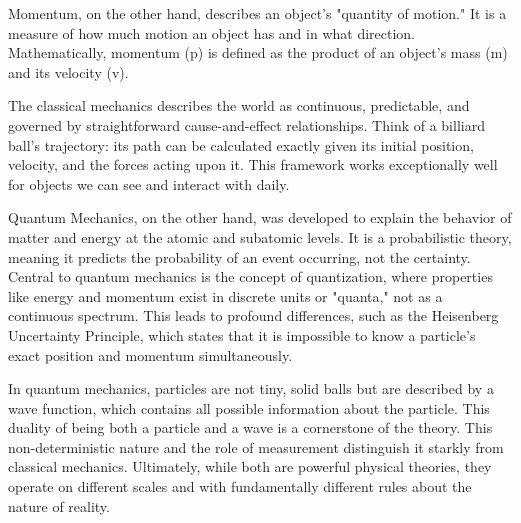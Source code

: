 \documentclass{article}
\begin{document}
Momentum, on the other hand, describes an object's "quantity of motion." It is a measure of how much motion an object has and in what direction. Mathematically, momentum (p) is defined as the product of an object's mass (m) and its velocity (v).


The classical mechanics describes the world as continuous, predictable, and governed by straightforward cause-and-effect relationships. Think of a billiard ball's trajectory: its path can be calculated exactly given its initial position, velocity, and the forces acting upon it. This framework works exceptionally well for objects we can see and interact with daily.

Quantum Mechanics, on the other hand, was developed to explain the behavior of matter and energy at the atomic and subatomic levels. It is a probabilistic theory, meaning it predicts the probability of an event occurring, not the certainty. Central to quantum mechanics is the concept of quantization, where properties like energy and momentum exist in discrete units or "quanta," not as a continuous spectrum. This leads to profound differences, such as the Heisenberg Uncertainty Principle, which states that it is impossible to know a particle's exact position and momentum simultaneously.

In quantum mechanics, particles are not tiny, solid balls but are described by a wave function, which contains all possible information about the particle. This duality of being both a particle and a wave is a cornerstone of the theory. This non-deterministic nature and the role of measurement distinguish it starkly from classical mechanics. Ultimately, while both are powerful physical theories, they operate on different scales and with fundamentally different rules about the nature of reality.
\end{document}
